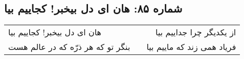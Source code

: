 \begin{center}
\section*{شماره ۸۵: هان ای دل بیخبر! کجاییم بیا}
\label{sec:085}
\begin{longtable}{l p{0.5cm} r}
هان ای دل بیخبر! کجاییم بیا
&&
از یکدیگر چرا جداییم بیا
\\
بنگر تو که هر ذرّه که در عالم هست
&&
فریاد همی زند که ماییم بیا
\\
\end{longtable}
\end{center}

